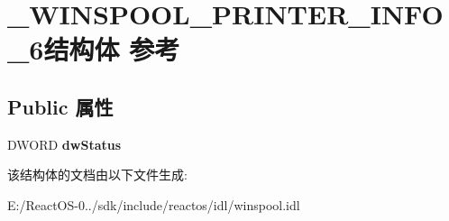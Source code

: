 \hypertarget{struct___w_i_n_s_p_o_o_l___p_r_i_n_t_e_r___i_n_f_o__6}{}\section{\+\_\+\+W\+I\+N\+S\+P\+O\+O\+L\+\_\+\+P\+R\+I\+N\+T\+E\+R\+\_\+\+I\+N\+F\+O\+\_\+6结构体 参考}
\label{struct___w_i_n_s_p_o_o_l___p_r_i_n_t_e_r___i_n_f_o__6}
\subsection*{Public 属性}
\begin{DoxyCompactItemize}
\item 
\mbox{\label{struct___w_i_n_s_p_o_o_l___p_r_i_n_t_e_r___i_n_f_o__6_a06d3da13cd3fd5bedbb4efb3b1ef27a5}} 
D\+W\+O\+RD {\bfseries dw\+Status}
\end{DoxyCompactItemize}


该结构体的文档由以下文件生成\+:\begin{DoxyCompactItemize}
\item 
E\+:/\+React\+O\+S-\/0../sdk/include/reactos/idl/winspool.\+idl\end{DoxyCompactItemize}
